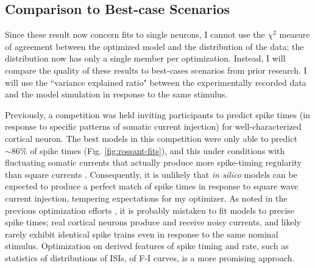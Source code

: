 \subsection{Comparison to Best-case Scenarios}
Since these result now concern fits to single neurons, I cannot use the $\chi^2$ measure of agreement between the optimized model and the distribution of the data; the distribution now has only a single member per optimization.
Instead, I will compare the quality of these results to best-cases scenarios from prior research.
I will use the ``variance explained ratio" between the experimentally recorded data and the model simulation in response to the same stimulus.

Previously, a competition was held \citep{incf_multi} inviting participants to predict spike times (in response to specific patterns of somatic current injection) for well-characterized cortical neuron.
The best models in this competition were only able to predict $\sim86\%$ of spike times (Fig. \ref{fig:rossant-fits}), and this under conditions with fluctuating somatic currents that actually produce more spike-timing regularity than square currents \citep{mainen1995reliability}.
Consequently, it is unlikely that \emph{in silico} models can be expected to produce a perfect match of spike times in response to square wave current injection, tempering expectations for my optimizer.
As noted in the previous optimization efforts \citep{druckmann2007novel}, it is probably mistaken to fit models to precise spike times; real cortical neurons produce and receive noisy currents, and likely rarely exhibit identical spike trains even in response to the same nominal stimulus.
Optimization on derived features of spike timing and rate, such as statistics of distributions of ISIs, of F-I curves, is a more promising approach.

